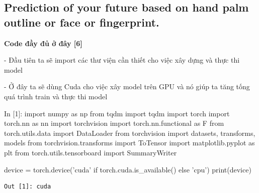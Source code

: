 \documentclass[12pt, a4paper]{article}
\begin{document}
\newpage
\subsection{Prediction of your future based on hand palm outline or face or fingerprint.  }
\par \textbf{Code đầy đủ ở đây [6]}
\par\hspace{0cm}- Đầu tiên ta sẽ import các thư viện cần thiết cho việc xây dựng và thực thi model
\par\hspace{0cm}- Ở đây ta sẽ dùng Cuda cho việc xây model trên GPU và nó giúp ta tăng tống quá trình train và thực thi model
\begin{python}
In [1]: import numpy as np
        from tqdm import tqdm
        import torch
        import torch.nn as nn
        import torchvision
        import torch.nn.functional as F
        from torch.utils.data import DataLoader
        from torchvision import datasets, transforms, models
        from torchvision.transforms import ToTensor
        import matplotlib.pyplot as plt
        from torch.utils.tensorboard import SummaryWriter
        
        
        device = torch.device('cuda' if torch.cuda.is_available() else 'cpu')
        print(device)
\end{python}
\begin{verbatim}
Out [1]: cuda

\end{verbatim}
\end{document}

